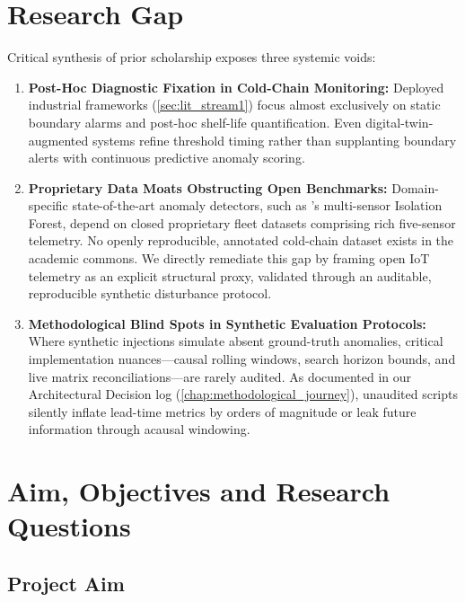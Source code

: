 \documentclass[11pt,a4paper,oneside]{report}
\begin{document}
\chapter{Research Gap}
\label{chap:research_gap}

Critical synthesis of prior scholarship exposes three systemic voids:

\begin{enumerate}[leftmargin=*,itemsep=4pt]
    \item \textbf{Post-Hoc Diagnostic Fixation in Cold-Chain Monitoring:} Deployed industrial frameworks (\cref{sec:lit_stream1}) focus almost exclusively on static boundary alarms and post-hoc shelf-life quantification. Even digital-twin-augmented systems \parencite{meng2024costeffective} refine threshold timing rather than supplanting boundary alerts with continuous predictive anomaly scoring.
    \item \textbf{Proprietary Data Moats Obstructing Open Benchmarks:} Domain-specific state-of-the-art anomaly detectors, such as \textcite{xie2025anomaly}'s multi-sensor Isolation Forest, depend on closed proprietary fleet datasets comprising rich five-sensor telemetry. No openly reproducible, annotated cold-chain dataset exists in the academic commons. We directly remediate this gap by framing open IoT telemetry as an explicit structural proxy, validated through an auditable, reproducible synthetic disturbance protocol.
    \item \textbf{Methodological Blind Spots in Synthetic Evaluation Protocols:} Where synthetic injections simulate absent ground-truth anomalies, critical implementation nuances---causal rolling windows, search horizon bounds, and live matrix reconciliations---are rarely audited. As documented in our Architectural Decision log (\cref{chap:methodological_journey}), unaudited scripts silently inflate lead-time metrics by orders of magnitude or leak future information through acausal windowing.
\end{enumerate}

\chapter[Aim, Objectives \& RQs]{Aim, Objectives and Research Questions}
\label{chap:aim_objectives}

\section{Project Aim}
\label{sec:aim}
\end{document}
